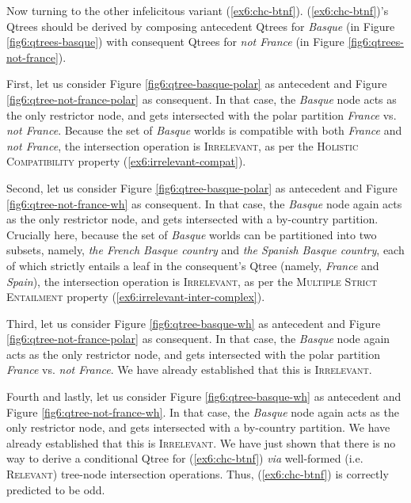 Now turning to the other infelicitous variant (\ref{ex6:chc-btnf}). (\ref{ex6:chc-btnf})'s Qtrees should be derived by composing antecedent Qtrees for \textit{Basque} (in Figure \ref{fig6:qtrees-basque}) with consequent Qtrees for \textit{not France} (in Figure \ref{fig6:qtrees-not-france}).

First, let us consider Figure \ref{fig6:qtree-basque-polar} as antecedent and Figure \ref{fig6:qtree-not-france-polar} as consequent. In that case, the \textit{Basque} node acts as the only restrictor node, and gets intersected with the polar partition \textit{France} vs. \textit{not France}. Because the set of \textit{Basque} worlds is compatible with both \textit{France} and \textit{not France}, the intersection operation is \textsc{Irrelevant}, as per the \textsc{Holistic Compatibility} property (\ref{ex6:irrelevant-compat}).

Second, let us consider Figure \ref{fig6:qtree-basque-polar} as antecedent and Figure \ref{fig6:qtree-not-france-wh} as consequent. In that case, the \textit{Basque} node again acts as the only restrictor node, and gets intersected with a by-country partition. Crucially here, because the set of \textit{Basque} worlds can be partitioned into two subsets, namely, \textit{the French Basque country} and \textit{the Spanish Basque country}, each of which strictly entails a leaf in the consequent's Qtree (namely, \textit{France} and \textit{Spain}), the intersection operation is \textsc{Irrelevant}, as per the \textsc{Multiple Strict Entailment} property (\ref{ex6:irrelevant-inter-complex}).

Third, let us consider Figure \ref{fig6:qtree-basque-wh} as antecedent and Figure \ref{fig6:qtree-not-france-polar} as consequent. In that case, the \textit{Basque} node again acts as the only restrictor node, and gets intersected with the polar partition \textit{France} vs. \textit{not France}. We have already established that this is \textsc{Irrelevant}.

Fourth and lastly, let us consider Figure \ref{fig6:qtree-basque-wh} as antecedent and Figure \ref{fig6:qtree-not-france-wh}. In that case, the \textit{Basque} node again acts as the only restrictor node, and gets intersected with a by-country partition. We have already established that this is \textsc{Irrelevant}. We have just shown that there is no way to derive a conditional Qtree for (\ref{ex6:chc-btnf}) \textit{via} well-formed (i.e. \textsc{Relevant}) tree-node intersection operations. Thus, (\ref{ex6:chc-btnf}) is correctly predicted to be odd.\\


